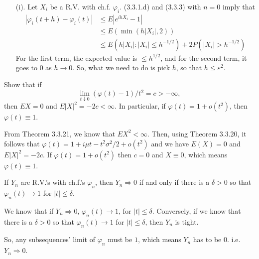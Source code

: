 \documentclass[en, normal, 12pt, black]{elegantnote}
\newenvironment{exercise}[1]{\begin{tcolorbox}[colback=black!15, colframe=black!80, breakable, title=#1]}{\end{tcolorbox}}
\newenvironment{solution}{\begin{tcolorbox}[colback=white, colframe=black!50, breakable, title=Solution. ]\setlength{\parskip}{0.8em}}{\end{tcolorbox}}
\begin{document}
\begin{solution}
    \begin{itemize}
        \item[(i).] Let $X_{i}$ be a R.V. with ch.f. $\varphi_{i}$. (3.3.1.d) and (3.3.3) with $n=0$ imply that
        \[
            \begin{aligned}
            \left|\varphi_{i}(t+h)-\varphi_{i}(t)\right| & \leqslant E\left|e^{i h X_{i}}-1\right|\\ & \leqslant E \left(\min \left(h\left|X_{i}\right|, 2\right)\right) \\
            & \leq E\left(h\left|X_{i}\right|:\left|X_{i}\right| \leq h^{-1 / 2}\right)+2 P\left(\left|X_{i}\right|>h^{-1 / 2}\right)
            \end{aligned}
        \]
        For the first term, the expected value is $\leqslant h^{1 / 2}$, and for the second term, it  goes to $0$ as $h \rightarrow 0$. So, what we need to do is pick $h$, so that $h\leqslant\varepsilon^2$. 
    \end{itemize}
\end{solution}


\begin{exercise}{3.3.16}
    Show that if 
    \[
        \lim _{t \downarrow 0}(\varphi(t)-1) / t^{2}=c>-\infty,
    \]
    then $E X=0$ and $E|X|^{2}=-2 c<\infty$. In particular, if $\varphi(t)=1+o\left(t^{2}\right)$, then $\varphi(t) \equiv 1$. 
\end{exercise}

\begin{solution}
    From Theorem 3.3.21, we know that $E X^{2}<\infty$. Then, using Theorem 3.3.20, it follows that $\varphi(t)=1+i \mu t-t^{2} \sigma^{2} / 2+o\left(t^{2}\right)$ and we have $E(X)=0$ and $E|X|^{2}=-2 c$. If $\varphi(t)=1+o\left(t^{2}\right)$ then $c=0$ and $X \equiv 0$, which means $\varphi(t)\equiv1$. 
\end{solution}

\begin{exercise}{3.3.17}
    If $Y_{n}$ are R.V.'s with ch.f.'s $\varphi_{n}$, then $Y_{n} \Rightarrow 0$ if and only if there is a $\delta>0$ so that $\varphi_{n}(t) \rightarrow 1$ for $|t| \leqslant \delta$. 
\end{exercise}

\begin{solution}
    We know that if $Y_n\Rightarrow0$, $\varphi_n(t)\rightarrow1$, for $|t|\leqslant\delta$. Conversely, if we know that there is a $\delta>0$ so that $\varphi_{n}(t) \rightarrow 1$ for $|t| \leqslant \delta$, then $Y_n$ is tight. 

    So, any subsequences' limit of $\varphi_n$ must be $1$, which means $Y_n$ has to be $0$. i.e. $Y_n\Rightarrow0$. 
\end{solution}
\end{document}
